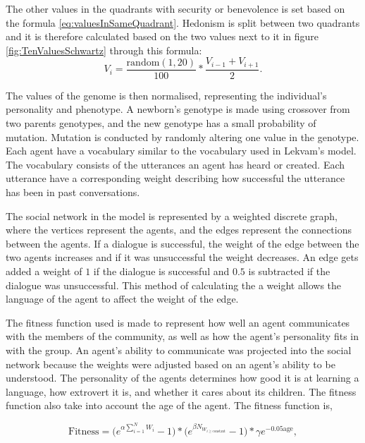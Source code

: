 The other values in the quadrants with security or benevolence is set based on the formula \ref{eq:valuesInSameQuadrant}. Hedonism is split between two quadrants and it is therefore calculated based on the two values next to it in figure \ref{fig:TenValuesSchwartz} through this formula:
\begin{equation}\label{eq:hedonism}
V_{i} = \frac{\mathrm{random}(1, 20)}{100} \ast \frac{V_{i-1} + V_{i+1}}{2}.
\end{equation}

The values of the genome is then normalised, representing the individual’s personality and phenotype. A newborn’s genotype is made using crossover from two parents genotypes, and the new genotype has a small probability of mutation. Mutation is conducted by randomly altering one value in the genotype. Each agent have a vocabulary similar to the vocabulary used in Lekvam’s model. The vocabulary consists of the utterances an agent has heard or created. Each utterance have a corresponding weight describing how successful the utterance has been in past conversations.     

The social network in the model is represented by a weighted discrete graph, where the vertices represent the agents, and the edges represent the connections between the agents. If a dialogue is successful, the weight of the edge between the two agents increases and if it was unsuccessful the weight decreases. An edge gets added a weight of $1$ if the dialogue is successful and $0.5$ is subtracted if the dialogue was unsuccessful. This method of calculating the a weight allows the language of the agent to affect the weight of the edge.
 
The fitness function used is made to represent how well an agent communicates with the members of the community, as well as how the agent’s personality fits in with the group. An agent's ability to communicate was projected into the social network because the weights were adjusted based on an agent’s ability to be understood. The personality of the agents determines how good it is at learning a language, how extrovert it is, and whether it cares about its children. The fitness function also take into account the age of the agent. The fitness function is,

\begin{equation}\label{eq:Fitness}
\text{Fitness} = \Big( e^{\alpha \sum_{i=1}^{N}{W_{i}}}-1 \Big) \ast \Big( e^{\beta N_{W_{i\geq \text{constant}}}}-1 \Big) \ast \gamma e^{-0.05 \text{age}},
\end{equation}

